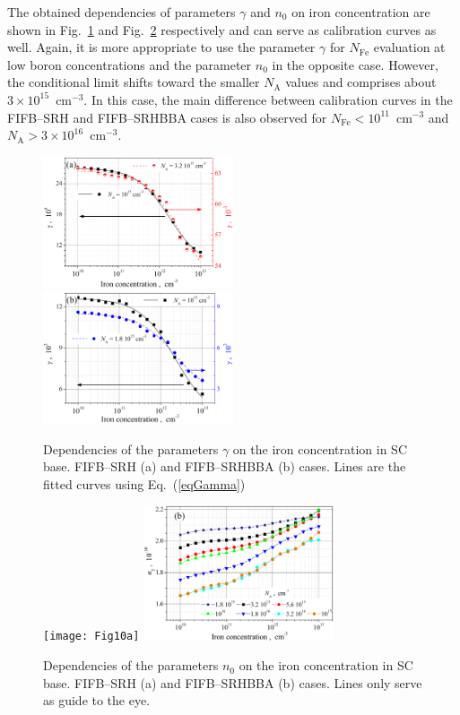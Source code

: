 \documentclass [sort&compress] {elsarticle}
\begin{document}
The obtained dependencies of parameters $\gamma$ and $n_0$ on iron concentration are shown in Fig.~\ref{fig9} and Fig.~\ref{fig10} respectively
and can serve as calibration curves as well.
Again, it is more appropriate to use the parameter $\gamma$ for $N_\mathrm{Fe}$ evaluation at low boron concentrations and the parameter $n_0$ in the opposite case.
However, the conditional limit shifts toward the smaller $N_\mathrm{A}$ values and comprises about $3\times10^{15}$~cm$^{-3}$.
In this case, the main difference between calibration curves in the FIFB--SRH and FIFB--SRHBBA cases is also observed for $N_\mathrm{Fe}<10^{11}$~cm$^{-3}$ and $N_\mathrm{A}>3\times10^{16}$~cm$^{-3}$.


\begin{figure}
\includegraphics[width=0.5\textwidth]{Fig9a}%
\includegraphics[width=0.5\textwidth]{Fig9b}
\caption{\label{fig9}
Dependencies of the parameters $\gamma$ on the iron concentration in SC base.
FIFB--SRH (a) and FIFB--SRHBBA (b) cases.
Lines are the fitted curves using Eq.~(\ref{eqGamma})
}%
\end{figure}

\begin{figure}
\texttt{[image: Fig10a]}%
\includegraphics[width=0.5\textwidth]{Fig10b}
\caption{\label{fig10}
Dependencies of the parameters $n_0$ on the iron concentration in SC base.
FIFB--SRH (a) and FIFB--SRHBBA (b) cases.
Lines only serve as guide to the eye.
}%
\end{figure}
\end{document}
